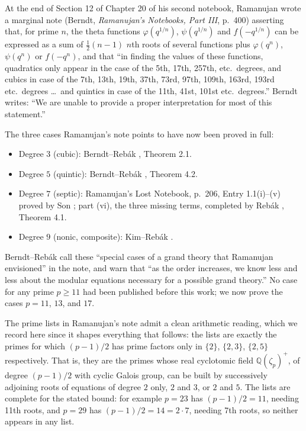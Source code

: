 \documentclass[11pt]{amsart}
\theoremstyle{plain}
\theoremstyle{definition}
\theoremstyle{remark}
\newcommand{\Q}{\mathbb{Q}}
\begin{document}
At the end of Section 12 of Chapter 20 of his second notebook, Ramanujan wrote a
marginal note (Berndt, \emph{Ramanujan's Notebooks, Part III}, p.~400) asserting that,
for prime $n$, the theta functions $\varphi(q^{1/n})$, $\psi(q^{1/n})$ and
$f(-q^{1/n})$ can be expressed as a sum of $\frac12(n-1)$ $n$th roots of several
functions plus $\varphi(q^n)$, $\psi(q^n)$ or $f(-q^n)$, and that ``in finding the
values of these functions, quadratics only appear in the case of the 5th, 17th,
257th, etc.\ degrees, and cubics in case of the 7th, 13th, 19th, 37th, 73rd, 97th,
109th, 163rd, 193rd etc.\ degrees \dots\ and quintics in case of the 11th, 41st,
101st etc.\ degrees.'' Berndt writes: ``We are unable to provide a proper
interpretation for most of this statement.''

The three cases Ramanujan's note points to have now been proved in full:
\begin{itemize}
\item Degree $3$ (cubic): Berndt--Reb\'ak \cite{BR25}, Theorem 2.1.
\item Degree $5$ (quintic): Berndt--Reb\'ak \cite{BR25}, Theorem 4.2.
\item Degree $7$ (septic): Ramanujan's Lost Notebook, p.~206, Entry 1.1(i)--(v)
proved by Son \cite{Son01}; part (vi), the three missing terms, completed by
Reb\'ak \cite{Reb23}, Theorem 4.1.
\item Degree $9$ (nonic, composite): Kim--Reb\'ak \cite{KR25}.
\end{itemize}
Berndt--Reb\'ak call these ``special cases of a grand theory that Ramanujan
envisioned'' in the note, and warn that ``as the order increases, we know less and
less about the modular equations necessary for a possible grand theory.'' No case
for any prime $p \geq 11$ had been published before this work; we now prove the
cases $p = 11$, $13$, and $17$.

The prime lists in Ramanujan's note admit a clean arithmetic reading, which we
record here since it shapes everything that follows: the lists are exactly the
primes for which $(p-1)/2$ has prime factors only in $\{2\}$, $\{2,3\}$, $\{2,5\}$
respectively. That is, they are the primes whose real cyclotomic field
$\Q(\zeta_p)^+$, of degree $(p-1)/2$ with cyclic Galois group, can be built by
successively adjoining roots of equations of degree $2$ only, $2$ and $3$, or $2$
and $5$. The lists are complete for the stated bound: for example $p=23$ has
$(p-1)/2 = 11$, needing 11th roots, and $p=29$ has $(p-1)/2 = 14 = 2\cdot 7$,
needing 7th roots, so neither appears in any list.
\end{document}
